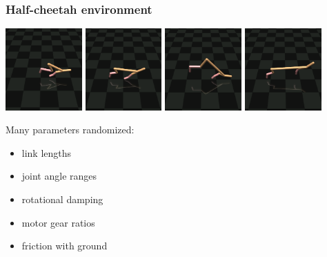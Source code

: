 \documentclass{beamer}
\begin{document}
\begin{frame}
\frametitle{Half-cheetah environment}

\includegraphics[trim=4cm 3cm 0cm 4cm, clip, width=0.22\textwidth]{cheetah_short.png}\hfill
\includegraphics[trim=4cm 3cm 0cm 4cm, clip, width=0.22\textwidth]{cheetah_medium.png}\hfill
\includegraphics[trim=4cm 3cm 0cm 4cm, clip, width=0.22\textwidth]{cheetah_backleg.png}\hfill
\includegraphics[trim=4cm 3cm 0cm 4cm, clip, width=0.22\textwidth]{cheetah_long.png}

\vspace{0.5cm}
Many parameters randomized:
\begin{itemize}
\item link lengths
\item joint angle ranges
\item rotational damping
\item motor gear ratios
\item friction with ground
\end{itemize}
\end{frame}
\end{document}
